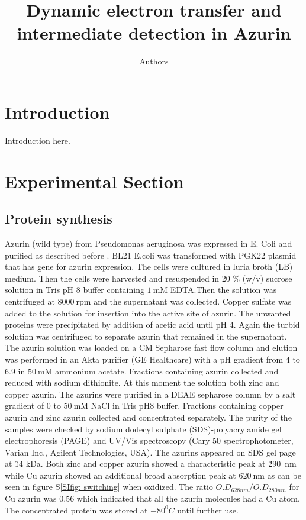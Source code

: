 \documentclass[journal=jacsat,manuscript=article]{achemso}
\author{Authors}
\affiliation{Huygens-Kamerlingh Onnes Laboratory, Leiden University, RA, Leiden, The Netherlands}
\title[]
{Dynamic electron transfer and intermediate detection in Azurin}
\begin{document}
\section{Introduction}
Introduction here.
\section{Experimental Section}
\subsection{Protein synthesis}
Azurin (wild type) from Pseudomonas aeruginosa was expressed in E. Coli and purified as described before \citep{kamp1990purification}. BL21 E.coli was transformed with PGK22 plasmid that has gene for azurin expression. The cells were cultured in luria broth (LB) medium. Then the cells were harvested and resuspended in 20 \% (w/v) sucrose solution in Tris pH 8 buffer containing $1~$mM EDTA.Then the solution was centrifuged at $8000~$rpm and the supernatant was collected. Copper sulfate was added to the solution for insertion into the active site of azurin. The unwanted proteins were precipitated by addition of acetic acid until pH 4. Again the turbid solution was centrifuged to separate azurin that remained in the supernatant. The azurin solution was loaded on a CM Sepharose fast flow column and elution was performed in an Akta purifier (GE Healthcare) with a pH gradient from $4$ to $6.9$ in $50~$mM ammonium acetate. Fractions containing azurin collected and reduced with sodium dithionite. At this moment the solution both zinc and copper azurin. The azurins were purified in a DEAE sepharose column by a salt gradient of 0 to $50~$mM NaCl in Tris pH8 buffer. Fractions containing copper azurin and zinc azurin collected and concentrated separately. The purity of the samples were checked by sodium dodecyl sulphate (SDS)-polyacrylamide gel electrophoresis (PAGE) and UV/Vis spectroscopy (Cary 50 spectrophotometer, Varian Inc., Agilent Technologies, USA). The azurins appeared on SDS gel page at \~14 kDa. Both zinc and copper azurin showed a characteristic peak at \~290~nm while Cu azurin showed an additional broad absorption peak at $620~$nm as can be seen in figure S\ref{SIfig: switching} when oxidized. The ratio $O.D_{628nm}/O.D_{280nm}$ for Cu azurin was 0.56 which indicated that all the azurin molecules had a Cu atom. The concentrated protein was stored at $-80^0 C$ until further use.
\end{document}
